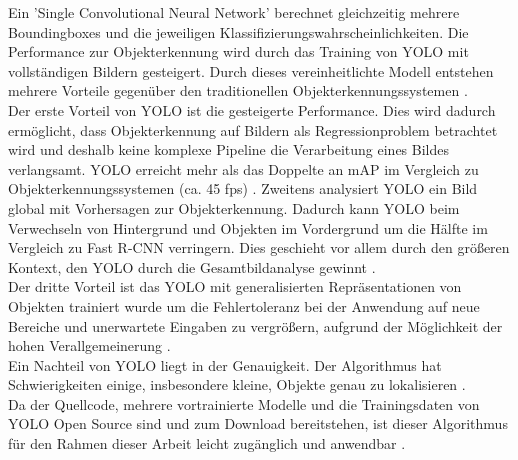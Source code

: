 {{	Ein 'Single Convolutional Neural Network' berechnet gleichzeitig mehrere Boundingboxes und die jeweiligen Klassifizierungswahrscheinlichkeiten. Die Performance zur Objekterkennung wird durch das Training von YOLO mit vollständigen Bildern gesteigert. Durch dieses vereinheitlichte Modell entstehen mehrere Vorteile gegenüber den traditionellen Objekterkennungssystemen \citep{Redmon2016}. \\
	Der erste Vorteil von YOLO ist die gesteigerte Performance. Dies wird dadurch ermöglicht, dass Objekterkennung auf Bildern als Regressionproblem betrachtet wird und deshalb keine komplexe Pipeline die Verarbeitung eines Bildes verlangsamt. YOLO erreicht mehr als das Doppelte an mAP  im Vergleich zu Objekterkennungssystemen (ca. 45 fps) \citep{Redmon2016}. 
	Zweitens analysiert YOLO ein Bild global mit Vorhersagen zur Objekterkennung. Dadurch kann YOLO beim Verwechseln von Hintergrund und Objekten im Vordergrund um die Hälfte im Vergleich zu Fast R-CNN verringern. Dies geschieht vor allem durch den größeren Kontext, den YOLO durch die Gesamtbildanalyse gewinnt \citep{Redmon2016}. \\
	Der dritte Vorteil ist das YOLO mit generalisierten Repräsentationen von Objekten trainiert wurde um die Fehlertoleranz bei der Anwendung auf neue Bereiche und unerwartete Eingaben zu vergrößern, aufgrund der Möglichkeit der hohen Verallgemeinerung \citep{Redmon2016}. \\
	Ein Nachteil von YOLO liegt in der Genauigkeit. Der Algorithmus hat Schwierigkeiten einige, insbesondere kleine, Objekte genau zu lokalisieren \citep{Redmon2016}. \\
	Da der Quellcode, mehrere vortrainierte Modelle und die Trainingsdaten von YOLO Open Source sind und zum Download bereitstehen, ist dieser Algorithmus für den Rahmen dieser Arbeit leicht zugänglich und anwendbar \citep{Redmon2016}. \\

}}
